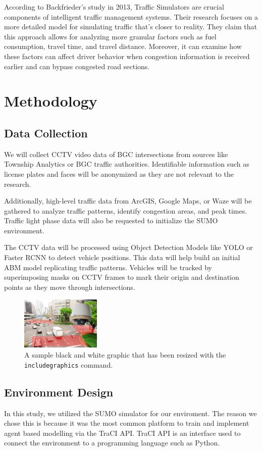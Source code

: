 According to Backfrieder's study in 2013, Traffic Simulators are crucial components of intelligent traffic management systems. Their research focuses on a more detailed model for simulating traffic that's closer to reality. They claim that this approach allows for analyzing more granular factors such as fuel consumption, travel time, and travel distance. Moreover, it can examine how these factors can affect driver behavior when congestion information is received earlier and can bypass congested road sections.

\section{Methodology}

\subsection{Data Collection}
We will collect CCTV video data of BGC intersections from sources like Township Analytics or BGC traffic authorities. Identifiable information such as license plates and faces will be anonymized as they are not relevant to the research.

Additionally, high-level traffic data from ArcGIS, Google Maps, or Waze will be gathered to analyze traffic patterns, identify congestion areas, and peak times. Traffic light phase data will also be requested to initialize the SUMO environment.

The CCTV data will be processed using Object Detection Models like YOLO or Faster RCNN to detect vehicle positions. This data will help build an initial ABM model replicating traffic patterns. Vehicles will be tracked by superimposing masks on CCTV frames to mark their origin and destination points as they move through intersections.

\begin{figure}
    \includegraphics[height=1in, width=1.5in]{figures/cctv_frame_mask.png}
    \caption{A sample black and white graphic that has
    been resized with the \texttt{includegraphics} command.}
\end{figure}

\subsection{Environment Design}
In this study, we utilized the SUMO simulator for our enviroment. The reason we chose this is because it was the most common platform to train and implement agent based modelling via the TraCI API. TraCI API is an interface used to connect the environment to a programming language such as Python.

